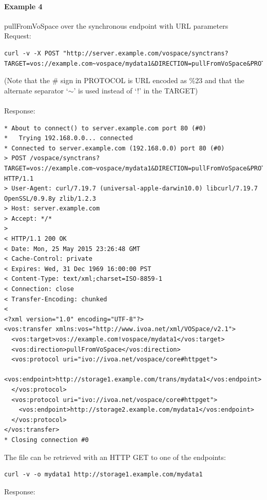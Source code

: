 \documentclass[11pt,a4paper]{ivoa}
\begin{document}
\paragraph{Example 4}
pullFromVoSpace over the synchronous endpoint with URL parameters
\\[5px]
\noindent
Request:
\begin{lstlisting}
curl -v -X POST "http://server.example.com/vospace/synctrans?TARGET=vos://example.com~vospace/mydata1&DIRECTION=pullFromVoSpace&PROTOCOL=ivo://ivoa.net/vospace/core%23httpget"
\end{lstlisting}
(Note that the \# sign in PROTOCOL is URL encoded as \%23 and that the alternate separator `$\mathtt{\sim}$' is used instead of `!' in the TARGET) \\
\\
Response:
\begin{lstlisting}
* About to connect() to server.example.com port 80 (#0)
*   Trying 192.168.0.0... connected
* Connected to server.example.com (192.168.0.0) port 80 (#0)
> POST /vospace/synctrans?TARGET=vos://example.com~vospace/mydata1&DIRECTION=pullFromVoSpace&PROTOCOL=ivo://ivoa.net/vospace/core\%23httpget HTTP/1.1
> User-Agent: curl/7.19.7 (universal-apple-darwin10.0) libcurl/7.19.7 OpenSSL/0.9.8y zlib/1.2.3
> Host: server.example.com
> Accept: */*
>
< HTTP/1.1 200 OK
< Date: Mon, 25 May 2015 23:26:48 GMT
< Cache-Control: private
< Expires: Wed, 31 Dec 1969 16:00:00 PST
< Content-Type: text/xml;charset=ISO-8859-1
< Connection: close
< Transfer-Encoding: chunked
<
<?xml version="1.0" encoding="UTF-8"?>
<vos:transfer xmlns:vos="http://www.ivoa.net/xml/VOSpace/v2.1">
  <vos:target>vos://example.com!vospace/mydata1</vos:target>
  <vos:direction>pullFromVoSpace</vos:direction>
  <vos:protocol uri="ivo://ivoa.net/vospace/core#httpget">
    <vos:endpoint>http://storage1.example.com/trans/mydata1</vos:endpoint>
  </vos:protocol>
  <vos:protocol uri="ivo://ivoa.net/vospace/core#httpget">
    <vos:endpoint>http://storage2.example.com/mydata1</vos:endpoint>
  </vos:protocol>
</vos:transfer>
* Closing connection #0
\end{lstlisting}
The file can be retrieved with an HTTP GET to one of the endpoints:
\begin{lstlisting}
curl -v -o mydata1 http://storage1.example.com/mydata1
\end{lstlisting}
Response:
\end{document}
